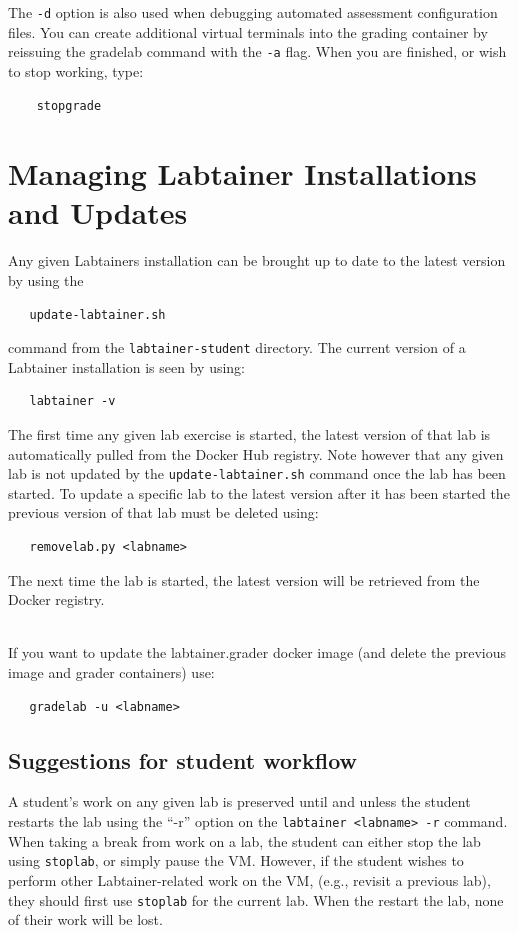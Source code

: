 \documentclass[12pt]{article}
\begin{document}
\noindent The {\tt -d} option is also used when debugging automated assessment configuration
files.  You can create additional virtual terminals into the grading container by reissuing
the gradelab command with the {\tt -a} flag.  When you are finished, or wish to stop working, type:
\begin{verbatim}
    stopgrade
\end{verbatim}

\section{Managing Labtainer Installations and Updates}
Any given Labtainers installation can be brought up to date to the latest version by using the
\begin{verbatim}
   update-labtainer.sh
\end{verbatim}
\noindent command from the {\tt labtainer-student} directory.  The current version of a Labtainer installation is seen by using:
\begin{verbatim}
   labtainer -v
\end{verbatim}
\noindent
The first time any given lab exercise is started, the latest version of that lab is automatically pulled from
the Docker Hub registry.
Note however that any given lab is not updated by the {\tt update-labtainer.sh} command once the lab has been started.  
To update a specific lab to the latest version after it has been started the previous version of that lab must be deleted
using:
\begin{verbatim}
   removelab.py <labname>
\end{verbatim}
\noindent The next time the lab is started, the latest version will be retrieved from the Docker registry.

\noindent \\If you want to update the labtainer.grader docker image (and delete the previous image and grader containers) use:
\begin{verbatim}
   gradelab -u <labname>
\end{verbatim}


\subsection{Suggestions for student workflow}
A student's work on any given lab is preserved until and unless the student restarts the lab using the ``-r'' 
option on the {\tt labtainer <labname> -r} command.  When taking a break from work on a lab, the student can
either stop the lab using {\tt stoplab}, or simply pause the VM.  However, if the student wishes to perform other
Labtainer-related work on the VM, (e.g., revisit a previous lab), they should first use {\tt stoplab} for the current
lab.  When the restart the lab, none of their work will be lost.
\end{document}
